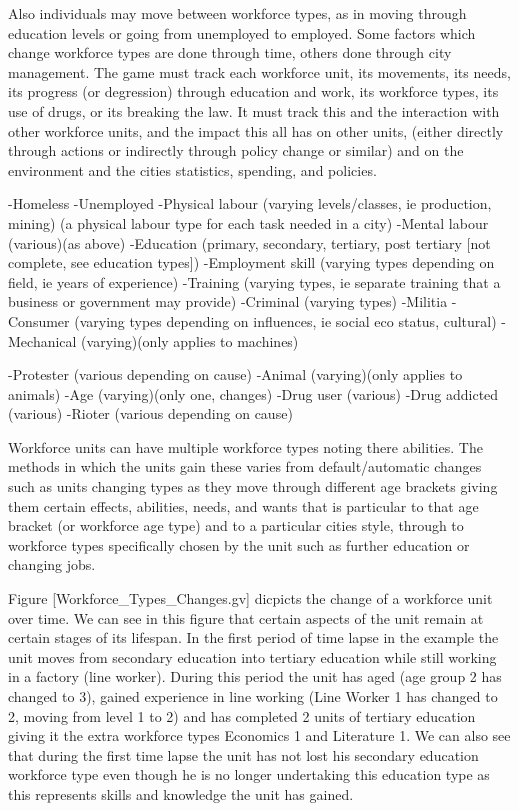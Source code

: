 Also individuals may move between workforce types, as in moving through education levels or going from unemployed to employed. Some factors which change workforce types are done through time, others done through city management. The game must track each workforce unit, its movements, its needs, its progress (or degression) through education and work, its workforce types, its use of drugs, or its breaking the law. It must track this and the interaction with other workforce units, and the impact this all has on other units, (either directly through actions or indirectly through policy change or similar) and on the environment and the cities statistics, spending, and policies.


-Homeless
-Unemployed
-Physical labour (varying levels/classes, ie production, mining)
	(a physical labour type for each task needed in a city) 
-Mental labour (various)(as above)
-Education (primary, secondary, tertiary, post tertiary [not complete, see education types])
-Employment skill (varying types depending on field, ie years of experience)
-Training (varying types, ie separate training that a business or government may provide)
-Criminal (varying types)
-Militia
-Consumer (varying types depending on influences, ie social eco status, cultural)
-Mechanical (varying)(only applies to machines)

-Protester (various depending on cause)
-Animal (varying)(only applies to animals)
-Age (varying)(only one, changes)
-Drug user (various)
-Drug addicted (various)
-Rioter (various depending on cause)




Workforce units can have multiple workforce types noting there abilities. The methods in which the units gain these varies from default/automatic changes such as units changing types as they move through different age brackets giving them certain effects, abilities, needs, and wants that is particular to that age bracket (or workforce age type) and to a particular cities style, through to workforce types specifically chosen by the unit such as further education or changing jobs. 

Figure [Workforce_Types_Changes.gv] dicpicts the change of a workforce unit over time. We can see in this figure that certain aspects of the unit remain at certain stages of its lifespan. In the first period of time lapse in the example the unit moves from secondary education into tertiary education while still working in a factory (line worker). During this period the unit has aged (age group 2 has changed to 3), gained experience in line working (Line Worker 1 has changed to 2, moving from level 1 to 2) and has completed 2 units of tertiary education giving it the extra workforce types Economics 1 and Literature 1. We can also see that during the first time lapse the unit has not lost his secondary education workforce type even though he is no longer undertaking this education type as this represents skills and knowledge the unit has gained. 

